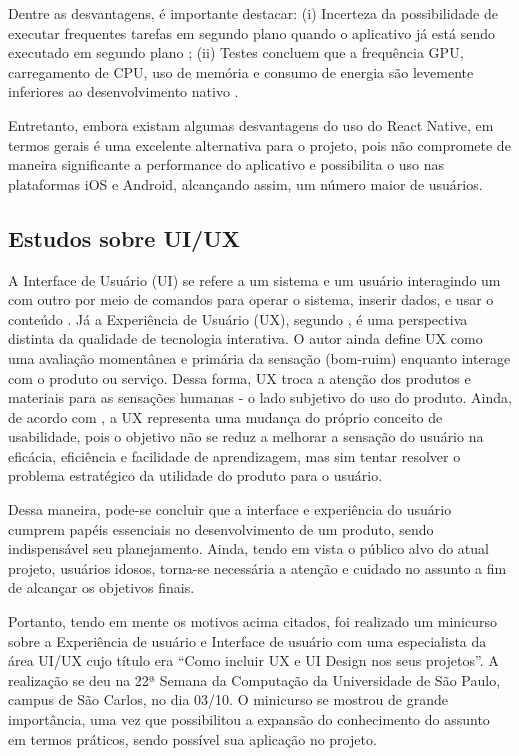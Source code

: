 Dentre as desvantagens, é importante destacar: (i) Incerteza da possibilidade de executar frequentes tarefas em segundo plano quando o aplicativo já está sendo executado em segundo plano \citep{sodebergJohansson}; (ii) Testes concluem que a frequência GPU, carregamento de CPU, uso de memória e consumo de energia são levemente inferiores ao desenvolvimento nativo \citep{danielsson2016}.

Entretanto, embora existam algumas desvantagens do uso do React Native, em termos gerais é uma excelente alternativa para o projeto, pois não compromete de maneira significante a performance do aplicativo e possibilita o uso nas plataformas iOS e Android, alcançando assim, um número maior de usuários.

\subsection{Estudos sobre UI/UX}
A Interface de Usuário (UI) se refere a um sistema e um usuário interagindo um com outro por meio de comandos para operar o sistema, inserir dados, e usar o conteúdo \citep{joo2015}. Já a Experiência de Usuário (UX), segundo \cite{marc2008}, é uma perspectiva distinta da qualidade de tecnologia interativa. O autor ainda define UX como uma avaliação momentânea e primária da sensação (bom-ruim) enquanto interage com o produto ou serviço. Dessa forma, UX troca a atenção dos produtos e materiais para as sensações humanas - o lado subjetivo do uso do produto. Ainda, de acordo com \cite{castilla2017}, a UX representa uma mudança do próprio conceito de usabilidade, pois o objetivo não se reduz a melhorar a sensação do usuário na eficácia, eficiência e facilidade de aprendizagem, mas sim tentar resolver o problema estratégico da utilidade do produto para o usuário. 

Dessa maneira, pode-se concluir que a interface e experiência do usuário cumprem papéis essenciais no desenvolvimento de um produto, sendo indispensável seu planejamento. Ainda, tendo em vista o público alvo do atual projeto, usuários idosos, torna-se necessária a atenção e cuidado no assunto a fim de alcançar os objetivos finais.

Portanto, tendo em mente os motivos acima citados, foi realizado um minicurso sobre a Experiência de usuário e Interface de usuário com uma especialista da área UI/UX cujo título era ``Como incluir UX e UI Design nos seus projetos''. A realização se deu na 22ª Semana da Computação da Universidade de São Paulo, campus de São Carlos, no dia 03/10. O minicurso se mostrou de grande importância, uma vez que possibilitou a expansão do conhecimento do assunto em termos práticos, sendo possível sua aplicação no projeto.

